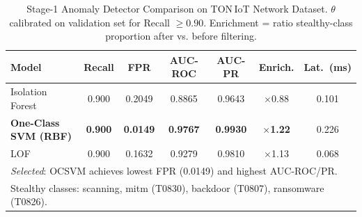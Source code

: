 \begin{table}[!t]
\renewcommand{\arraystretch}{1.2}
\caption{Stage-1 Anomaly Detector Comparison on TON\,IoT Network Dataset.
$\theta$ calibrated on validation set for Recall $\geq 0.90$.
Enrichment = ratio stealthy-class proportion after vs. before filtering.}
\label{tab:stage1}
\centering
\footnotesize
\begin{tabular}{lcccccc}
\toprule
\textbf{Model} & \textbf{Recall} & \textbf{FPR} & \textbf{AUC-ROC} & \textbf{AUC-PR} &
\textbf{Enrich.} & \textbf{Lat.~(ms)} \\
\midrule
Isolation Forest      & 0.900 & 0.2049 & 0.8865 & 0.9643 & $\times$0.88 & 0.101 \\
\textbf{One-Class SVM (RBF)} & \textbf{0.900} & \textbf{0.0149} & \textbf{0.9767} &
\textbf{0.9930} & $\times$\textbf{1.22} & 0.226 \\
LOF                   & 0.900 & 0.1632 & 0.9279 & 0.9810 & $\times$1.13 & 0.068 \\
\midrule
\multicolumn{7}{l}{\textit{Selected}: OCSVM achieves lowest FPR (0.0149) and highest AUC-ROC/PR.} \\
\multicolumn{7}{l}{Stealthy classes: scanning, mitm (T0830), backdoor (T0807), ransomware (T0826).} \\
\bottomrule
\end{tabular}
\end{table}
